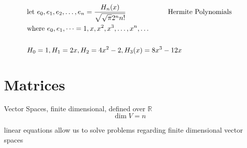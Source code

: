 \documentclass[svgnames]{article}   	%
\begin{document}
\begin{align*}
  &\text{let } e_0, e_1, e_2, \dots, e_n = \frac{H_n(x)}{ \sqrt{ \sqrt{\pi} 2^n
  n!}} \hspace{60px} \text{Hermite Polynomials} \\
  &\text{where } e_0, e_1, \dots = {1, x, x^2, x^3, \dots, x^n, \dots } \\\\
  &H_0 = 1, H_1 = 2x, H_2 = 4x^2 - 2, H_3(x) = 8x^3 - 12x
\end{align*}
\newpage
\section{Matrices} 

Vector Spaces, finite dimensional, defined over $\mathbb{R}$ 
\[
\dim V = n
\]

linear equations allow us to solve problems regarding finite dimensional vector
spaces
\end{document}
